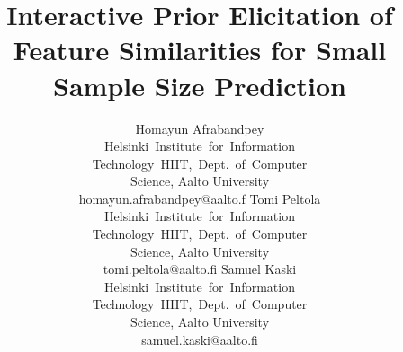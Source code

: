 \documentclass{sig-alternate}
\begin{document}
\title{Interactive Prior Elicitation of Feature Similarities for Small
Sample Size Prediction}


\author{
\alignauthor
Homayun Afrabandpey\\
       \affaddr\small\mbox{Helsinki Institute for Information}\\
       \affaddr\small\mbox{Technology HIIT, Dept. of Computer}\\
       \affaddr\small{Science, Aalto University}\\
       \email\small{homayun.afrabandpey@aalto.f}
\alignauthor
Tomi Peltola\\
       \affaddr\small\mbox{Helsinki Institute for Information}\\
       \affaddr\small\mbox{Technology HIIT, Dept. of Computer}\\
       \affaddr\small{Science, Aalto University}\\
       \email\small{tomi.peltola@aalto.fi}
\alignauthor
Samuel Kaski\\
       \affaddr\small\mbox{Helsinki Institute for Information}\\
       \affaddr\small\mbox{Technology HIIT, Dept. of Computer}\\
       \affaddr\small{Science, Aalto University}\\
       \email\small{samuel.kaski@aalto.fi}
}

\maketitle
\end{document}
